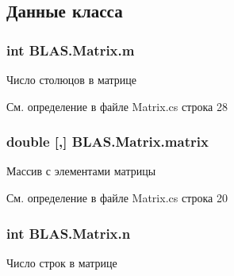 \subsection{Данные класса}
\subsubsection[{\texorpdfstring{m}{m}}]{\setlength{\rightskip}{0pt plus 5cm}int B\+L\+A\+S.\+Matrix.\+m\hspace{0.3cm}{\ttfamily [private]}}\hypertarget{class_b_l_a_s_1_1_matrix_aa6751bae1ef176548c952a7789953bfa}{}\label{class_b_l_a_s_1_1_matrix_aa6751bae1ef176548c952a7789953bfa}


Число столюцов в матрице 



См. определение в файле Matrix.\+cs строка 28

\subsubsection[{\texorpdfstring{matrix}{matrix}}]{\setlength{\rightskip}{0pt plus 5cm}double \mbox{[},\mbox{]} B\+L\+A\+S.\+Matrix.\+matrix\hspace{0.3cm}{\ttfamily [private]}}\hypertarget{class_b_l_a_s_1_1_matrix_a715e9d838fc32eecd436e1f83ffcde79}{}\label{class_b_l_a_s_1_1_matrix_a715e9d838fc32eecd436e1f83ffcde79}


Массив с элементами матрицы 



См. определение в файле Matrix.\+cs строка 20

\subsubsection[{\texorpdfstring{n}{n}}]{\setlength{\rightskip}{0pt plus 5cm}int B\+L\+A\+S.\+Matrix.\+n\hspace{0.3cm}{\ttfamily [private]}}\hypertarget{class_b_l_a_s_1_1_matrix_a0faac6434774d4c500a2dce48dcd8b84}{}\label{class_b_l_a_s_1_1_matrix_a0faac6434774d4c500a2dce48dcd8b84}


Число строк в матрице 




